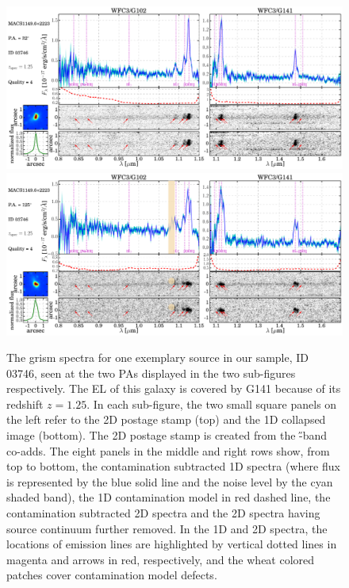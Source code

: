 \begin{figure}
    \includegraphics[width=\textwidth]{fig/spectra_id03746_pa32.pdf}
    \includegraphics[width=\textwidth]{fig/spectra_id03746_pa125.pdf}
    \caption[The \hst grism spectra for one exemplary source in our sample ID 03746.]{The \hst grism spectra for one exemplary source in our sample, ID 03746, seen at the two \glass PAs displayed in the 
    two sub-figures respectively. The \Ha EL of this galaxy is covered by G141 because of its redshift $z=1.25$.
    In each sub-figure, the two small square panels on the left refer to the 2D
    postage stamp (top) and the 1D collapsed image (bottom). The 2D postage stamp is created from the \hff \H-band co-adds. 
    The eight panels in the middle and right rows show, from top to bottom, the contamination subtracted 1D spectra (where flux is 
    represented by the blue solid line and the noise level by the cyan shaded band), the 1D contamination model in red dashed 
    line, the contamination subtracted 2D spectra and the 2D spectra having source continuum further removed.
    In the 1D and 2D spectra, the locations of emission lines are highlighted by vertical dotted lines in magenta and arrows in 
    red, respectively, and the wheat colored patches cover contamination model defects.}
    \label{fig:3746}
\end{figure}

